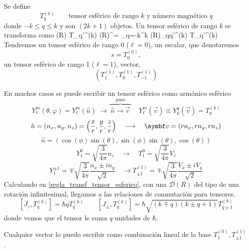 \documentclass[10pt,oneside]{CBFT_book}
\begin{document}
Se define 
\[
	T^{(k)}_q \qquad \text{tensor esférico de rango $k$ y número magnético $q$}
\]
donde $-k \leq q \leq k$ y son $(2k+1)$ objetos.
Un tensor esférico de rango $k$ se transforma como 
\be
	(R) T_{q'}^{(k)} (R)^\dagger = 
	\sum_{q=-k}^k \: (R)_{qq'}^{(k)} T_{q'}^{(k)} 
	\label{regla_transf_tensor_esferico}
\ee
Tendremos un tensor esférico de rango 0 ($\ell=0$), un escalar, que denotaremos
\[
	s = T^{(0)}_0, 
\]
un tensor esférico de rango 1 ($\ell=1$), vector,
\[
	(T^{(1)}_1,T^{(1)}_0,T^{(1)}_{-1})
\]

En muchos casos se puede escribir un tensor esférico como armónico esférico 
\[
	Y_\ell^{m}(\theta,\varphi) = Y_\ell^{m}(\hat{n}) \; \longrightarrow 
	\overbrace{ \phantom{.}\hat{n} \longrightarrow \vec{v}\phantom{.}}^{\text{paso}} \quad
	Y_\ell^m(\vec{v}) \equiv Y_k^q(\vec{v}) = T_q^{(k)}
\]
\[
	\hat{n} = (n_x,n_y,n_z) = \left( \frac{x}{r}, \frac{y}{r}, \frac{z}{r} \right) \quad 
	\longrightarrow \quad \vb{v} = (rn_x,rn_y,rn_z)
\]
\[
	\hat{n} = ( \cos(\phi)\sin(\theta), \sin(\phi)\sin(\theta), \cos(\theta))
\]
\[
	Y_1^0 = \sqrt{\frac{3}{4\pi}}n_z \quad \longrightarrow \quad T_1^0 = \sqrt{\frac{3}{4\pi}}V_z
\]
\[
	Y_1^{\pm 1} = \mp \sqrt{\frac{3}{4\pi}} \frac{n_x \pm i n_y}{\sqrt{2}} \quad \longrightarrow
	T_{\pm 1}^{(1)} = \mp \sqrt{\frac{3}{4\pi}} \frac{V_x \pm i V_y}{\sqrt{2}}
\]
Calculando en \eqref{regla_transf_tensor_esferico}, con una $\mathcal{D}(R)$ del tipo de una rotación 
infinitesimal, llegamos a las relaciones de conmutación para tensores.
\[
	[ J_z, T_q^{(k)} ] = \hbar q T_q^{(k)} \qquad 
	[J_{\pm},T_q^{(k)}] = \hbar \sqrt{(k \mp q)(k\pm q + 1)} T_{q\pm 1}^{(k)}
\]
donde vemos que el tensor le suma $q$ unidades de $\hbar$.

Cualquier vector lo puedo escribir como combinación lineal de la base $T_1^{(0)}, T_{\pm 1}^{(1)}$.

\end{document}
